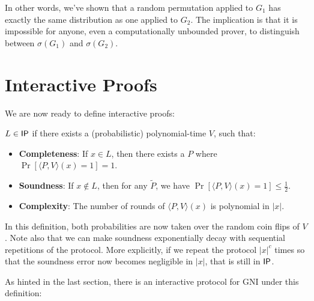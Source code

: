 \documentclass{article}
\begin{document}
In other words, we've shown that a random permutation applied to $G_1$ has exactly the same distribution as one applied to $G_2$.
The implication is that it is impossible for anyone, even a computationally unbounded prover, to distinguish between $\sigma(G_1)$ and $\sigma(G_2)$.

\section{Interactive Proofs}

We are now ready to define interactive proofs:

\begin{definition}
    $L \in \mathsf{IP}$ if there exists a (probabilistic) polynomial-time $V$, such that:
    \begin{itemize}
        \item \textbf{Completeness}: If $x \in L$, then there exists a $P$ where $\Pr[\langle P, V \rangle(x) = 1] = 1$.
        \item \textbf{Soundness}: If $x \notin L$, then for any $\tilde{P}$, we have $\Pr[\langle P, V \rangle(x) = 1] \leq \frac12$.
        \item \textbf{Complexity}: The number of rounds of $\langle P, V \rangle(x)$ is polynomial in $|x|$.
    \end{itemize}
\end{definition}

In this definition, both probabilities are now taken over the random coin flips of $V$.
Note also that we can make soundness exponentially decay with
sequential repetitions of the protocol. More explicitly, if we repeat the protocol $|x|^c$ times so that the soundness error now becomes negligible in $|x|$, that is still in $\mathsf{IP}$.

As hinted in the last section, there is an interactive protocol for GNI under this definition:
\end{document}
